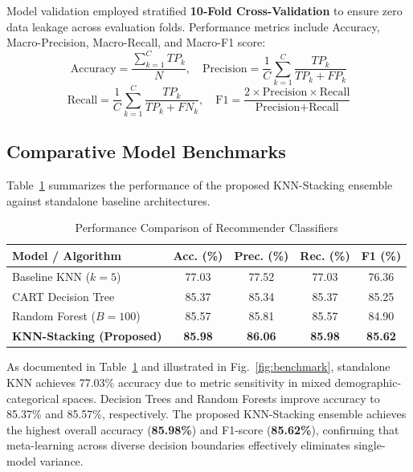 \documentclass[conference]{IEEEtran}
\begin{document}
Model validation employed stratified \textbf{10-Fold Cross-Validation} to ensure zero data leakage across evaluation folds. Performance metrics include Accuracy, Macro-Precision, Macro-Recall, and Macro-F1 score:
\begin{equation}
\text{Accuracy} = \frac{\sum_{k=1}^C TP_k}{N}, \quad \text{Precision} = \frac{1}{C}\sum_{k=1}^C \frac{TP_k}{TP_k + FP_k}
\end{equation}
\begin{equation}
\text{Recall} = \frac{1}{C}\sum_{k=1}^C \frac{TP_k}{TP_k + FN_k}, \quad \text{F1} = \frac{2 \times \text{Precision} \times \text{Recall}}{\text{Precision} + \text{Recall}}
\end{equation}

\subsection{Comparative Model Benchmarks}
Table~\ref{tab:results} summarizes the performance of the proposed KNN-Stacking ensemble against standalone baseline architectures.

\begin{table}[htbp]
\caption{Performance Comparison of Recommender Classifiers}
\begin{center}
\begin{tabular}{lcccc}
\toprule
\textbf{Model / Algorithm} & \textbf{Acc. (\%)} & \textbf{Prec. (\%)} & \textbf{Rec. (\%)} & \textbf{F1 (\%)} \\
\midrule
Baseline KNN ($k=5$) & 77.03 & 77.52 & 77.03 & 76.36 \\
CART Decision Tree & 85.37 & 85.34 & 85.37 & 85.25 \\
Random Forest ($B=100$) & 85.57 & 85.81 & 85.57 & 84.90 \\
\textbf{KNN-Stacking (Proposed)} & \textbf{85.98} & \textbf{86.06} & \textbf{85.98} & \textbf{85.62} \\
\bottomrule
\end{tabular}
\label{tab:results}
\end{center}
\end{table}

As documented in Table~\ref{tab:results} and illustrated in Fig.~\ref{fig:benchmark}, standalone KNN achieves 77.03\% accuracy due to metric sensitivity in mixed demographic-categorical spaces. Decision Trees and Random Forests improve accuracy to 85.37\% and 85.57\%, respectively. The proposed KNN-Stacking ensemble achieves the highest overall accuracy (\textbf{85.98\%}) and F1-score (\textbf{85.62\%}), confirming that meta-learning across diverse decision boundaries effectively eliminates single-model variance.
\end{document}

